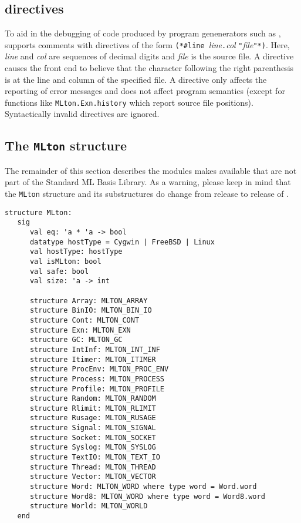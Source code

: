 
\subsection{{\nline} directives}
To aid in the debugging of code produced by program genenerators such as
,
{\mlton} supports comments with {\nline} directives of the form {\tt (*\#line
}{\it line}{\tt.}{\it col} {\tt "}{\it file}{\tt"*)}.  Here, {\it line} and {\it
col} are sequences of decimal digits and {\it file} is the source file.  A
{\nline} directive causes the front end to believe that the character following
the right parenthesis is at the line and column of the specified file.  A
{\nline} directive only affects the reporting of error messages and does not
affect program semantics (except for functions like {\tt MLton.Exn.history}
which report source file positions).  Syntactically invalid {\nline} directives
are ignored.

\subsection{The {\tt MLton} structure}

The remainder of this section describes the modules {\mlton} makes
available that are not part of the Standard ML Basis Library.  As a
warning, please keep in mind that the {\tt MLton} structure and its
substructures do change from release to release of {\mlton}.

\begin{verbatim}
structure MLton:
   sig
      val eq: 'a * 'a -> bool
      datatype hostType = Cygwin | FreeBSD | Linux
      val hostType: hostType
      val isMLton: bool
      val safe: bool
      val size: 'a -> int

      structure Array: MLTON_ARRAY
      structure BinIO: MLTON_BIN_IO
      structure Cont: MLTON_CONT
      structure Exn: MLTON_EXN
      structure GC: MLTON_GC
      structure IntInf: MLTON_INT_INF
      structure Itimer: MLTON_ITIMER
      structure ProcEnv: MLTON_PROC_ENV
      structure Process: MLTON_PROCESS
      structure Profile: MLTON_PROFILE
      structure Random: MLTON_RANDOM
      structure Rlimit: MLTON_RLIMIT
      structure Rusage: MLTON_RUSAGE
      structure Signal: MLTON_SIGNAL
      structure Socket: MLTON_SOCKET
      structure Syslog: MLTON_SYSLOG
      structure TextIO: MLTON_TEXT_IO
      structure Thread: MLTON_THREAD
      structure Vector: MLTON_VECTOR
      structure Word: MLTON_WORD where type word = Word.word
      structure Word8: MLTON_WORD where type word = Word8.word
      structure World: MLTON_WORLD
   end
\end{verbatim}

